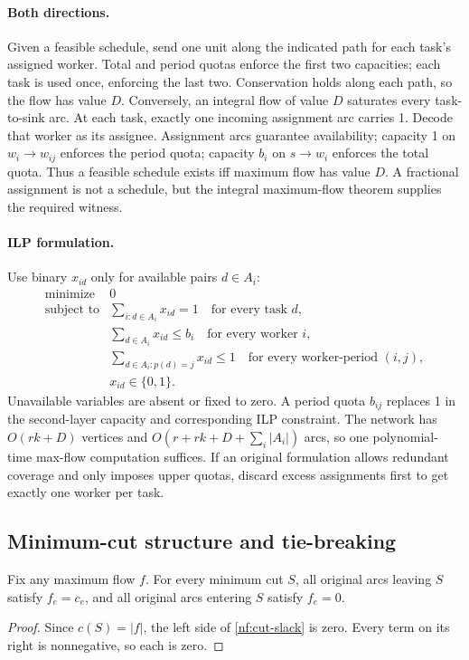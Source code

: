 \paragraph{Both directions.}
Given a feasible schedule, send one unit along the indicated path for each
task's assigned worker. Total and period quotas enforce the first two
capacities; each task is used once, enforcing the last two. Conservation
holds along each path, so the flow has value $D$.
Conversely, an integral flow of value $D$ saturates every task-to-sink arc.
At each task, exactly one incoming assignment arc carries 1. Decode that
worker as its assignee. Assignment arcs guarantee availability; capacity 1
on $w_i\to w_{ij}$ enforces the period quota; capacity $b_i$ on $s\to w_i$
enforces the total quota. Thus a feasible schedule exists iff maximum flow
has value $D$. A fractional assignment is not a schedule, but the integral
maximum-flow theorem supplies the required witness.

\paragraph{ILP formulation.}
Use binary $x_{id}$ only for available pairs $d\in A_i$:
\[
\begin{array}{rl}
 \text{minimize}&0\\[1mm]
 \text{subject to}&\displaystyle\sum_{i:d\in A_i}x_{id}=1
                    \quad\text{for every task }d,\\[2mm]
 &\displaystyle\sum_{d\in A_i}x_{id}\le b_i
                    \quad\text{for every worker }i,\\[2mm]
 &\displaystyle\sum_{d\in A_i:p(d)=j}x_{id}\le1
                    \quad\text{for every worker-period }(i,j),\\[2mm]
 &x_{id}\in\{0,1\}.
\end{array}
\]
Unavailable variables are absent or fixed to zero. A period quota $b_{ij}$
replaces 1 in the second-layer capacity and corresponding ILP constraint.
The network has $O(rk+D)$ vertices and
$O(r+rk+D+\sum_i|A_i|)$ arcs, so one polynomial-time max-flow computation
suffices. If an original formulation allows redundant coverage and only
imposes upper quotas, discard excess assignments first to get exactly one
worker per task.

\subsection{Minimum-cut structure and tie-breaking}\label{nf:cut-structure}
\begin{theorem}
Fix any maximum flow $f$. For every minimum cut $S$, all original arcs
leaving $S$ satisfy $f_e=c_e$, and all original arcs entering $S$ satisfy
$f_e=0$.
\end{theorem}
\begin{proof}
Since $c(S)=|f|$, the left side of \eqref{nf:cut-slack} is zero.
Every term on its right is nonnegative, so each is zero.
\end{proof}
